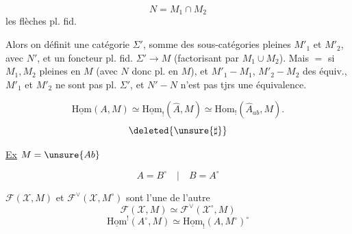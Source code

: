 \[N=M_1\cap M_2\]
 les flèches pl. fid.

Alors on définit une catégorie $\Sigma'$, somme des sous-catégories pleines $M'_1$ et $M'_2$, avec  $N'$, et un foncteur pl. fid. $\Sigma'\to M$ (factorisant par $M_1\cup M_2$). Mais $=$ si $M_1,M_2$ \uline{} pleines en $M$ (avec $N$ donc pl. en $M$), et $M'_1-M_1$, $M'_2-M_2$ des équiv., $M'_1$ et $M'_2$ ne sont pas   pl.  $\Sigma'$, et $N'-N$ n'est pas tjrs une équivalence.

\[
\underline{\mathrm{Hom}}(A,M)\simeq
\underline{\mathrm{Hom}}_!(\widehat A,M)\simeq
\mathrm{Hom}_!(\widehat A_{ab},M).
\]
\[\deleted{\unsure{\sharp}}\]

\uline{Ex} $M=\unsure{Ab}$


\[A=B^\circ\quad|\quad B=A^\circ\]



$\mathcal F(\mathcal X,M)$ et $\mathcal F^\vee(\mathcal X,M^\circ)$ sont  l'une de l'autre
\[
\mathcal F(\mathcal X,M)\simeq\mathcal F^\vee(\mathcal X^\circ,M)
\]
\[
\underline{\mathrm{Hom}}^!(A^\circ,M)\simeq\underline{\mathrm{Hom}}_!(A,M^\circ)^\circ
\]
